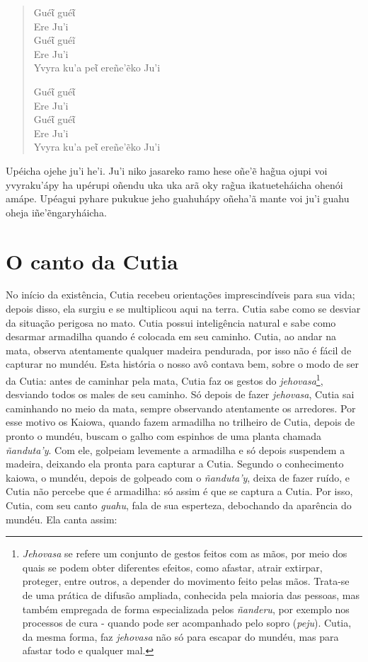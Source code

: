 \begin{verse}
Guéῖ guéῖ\\
Ere Ju'i\\
Guéῖ guéĩ\\
Ere Ju'i\\
Yvyra ku'a peῖ ereñe'ẽko Ju'i
        
Guéῖ guéῖ\\ 
Ere Ju'i\\
Guéῖ guéῖ\\
Ere Ju'i\\
Yvyra ku'a peῖ ereñe'ẽko Ju'i 
\end{verse}

Upéicha ojehe ju'i he'i. Ju'i niko jasareko ramo hese oñe'ẽ hag̃ua ojupi
voi yvyraku'ápy ha upérupi oñendu uka uka arã oky rag̃ua ikatueteháicha
ohenói amápe. Upéagui pyhare pukukue jeho guahuhápy oñeha'ã mante voi
ju'i guahu oheja iñe'ẽngaryháicha.

\chapter{O canto da Cutia}

No início da existência, Cutia recebeu orientações imprescindíveis para
sua vida; depois disso, ela surgiu e se multiplicou aqui na terra. Cutia
sabe como se desviar da situação perigosa no mato. Cutia possui
inteligência natural e sabe como desarmar armadilha quando é colocada em
seu caminho. Cutia, ao andar na mata, observa atentamente qualquer
madeira pendurada, por isso não é fácil de capturar no mundéu. Esta
história o nosso avô contava bem, sobre o modo de ser da Cutia: antes de
caminhar pela mata, Cutia faz os gestos do \emph{jehovasa}\footnote{\emph{Jehovasa}
  se refere um conjunto de gestos feitos com as mãos, por meio dos quais
  se podem obter diferentes efeitos, como afastar, atrair extirpar,
  proteger, entre outros, a depender do movimento feito pelas mãos.
  Trata-se de uma prática de difusão ampliada, conhecida pela maioria
  das pessoas, mas também empregada de forma especializada pelos
  \emph{ñanderu}, por exemplo nos processos de cura - quando pode ser
  acompanhado pelo sopro (\emph{peju}). Cutia, da mesma forma, faz
  \emph{jehovasa} não só para escapar do mundéu, mas para afastar todo e
  qualquer mal.}, desviando todos os males de seu caminho. Só depois de
fazer \emph{jehovasa}, Cutia sai caminhando no meio da mata, sempre
observando atentamente os arredores. Por esse motivo os Kaiowa, quando
fazem armadilha no trilheiro de Cutia, depois de pronto o mundéu, buscam
o galho com espinhos de uma planta chamada \emph{ñanduta'y}. Com ele,
golpeiam levemente a armadilha e só depois suspendem a madeira, deixando
ela pronta para capturar a Cutia. Segundo o conhecimento kaiowa, o
mundéu, depois de golpeado com o \emph{ñanduta'y}, deixa de fazer ruído,
e Cutia não percebe que é armadilha: só assim é que se captura a Cutia.
Por isso, Cutia, com seu canto \emph{guahu}, fala de sua esperteza,
debochando da aparência do mundéu. Ela canta assim:

